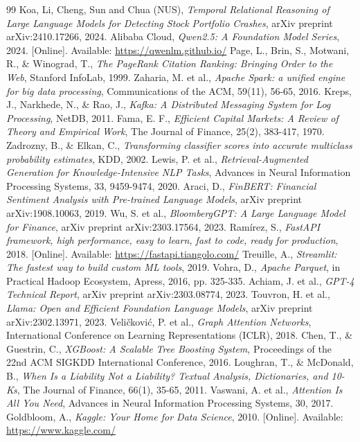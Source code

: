\documentclass[11pt, a4paper]{article}
\begin{document}
\newpage
\begin{thebibliography}{99}
Koa, Li, Cheng, Sun and Chua (NUS), \textit{Temporal Relational Reasoning of Large Language Models for Detecting Stock Portfolio Crashes}, arXiv preprint arXiv:2410.17266, 2024.
Alibaba Cloud, \textit{Qwen2.5: A Foundation Model Series}, 2024. [Online]. Available: \url{https://qwenlm.github.io/}
Page, L., Brin, S., Motwani, R., \& Winograd, T., \textit{The PageRank Citation Ranking: Bringing Order to the Web}, Stanford InfoLab, 1999.
Zaharia, M. et al., \textit{Apache Spark: a unified engine for big data processing}, Communications of the ACM, 59(11), 56-65, 2016.
Kreps, J., Narkhede, N., \& Rao, J., \textit{Kafka: A Distributed Messaging System for Log Processing}, NetDB, 2011.
Fama, E. F., \textit{Efficient Capital Markets: A Review of Theory and Empirical Work}, The Journal of Finance, 25(2), 383-417, 1970.
Zadrozny, B., \& Elkan, C., \textit{Transforming classifier scores into accurate multiclass probability estimates}, KDD, 2002.
Lewis, P. et al., \textit{Retrieval-Augmented Generation for Knowledge-Intensive NLP Tasks}, Advances in Neural Information Processing Systems, 33, 9459-9474, 2020.
Araci, D., \textit{FinBERT: Financial Sentiment Analysis with Pre-trained Language Models}, arXiv preprint arXiv:1908.10063, 2019.
Wu, S. et al., \textit{BloombergGPT: A Large Language Model for Finance}, arXiv preprint arXiv:2303.17564, 2023.
Ramírez, S., \textit{FastAPI framework, high performance, easy to learn, fast to code, ready for production}, 2018. [Online]. Available: \url{https://fastapi.tiangolo.com/}
Treuille, A., \textit{Streamlit: The fastest way to build custom ML tools}, 2019.
Vohra, D., \textit{Apache Parquet}, in Practical Hadoop Ecosystem, Apress, 2016, pp. 325-335.
Achiam, J. et al., \textit{GPT-4 Technical Report}, arXiv preprint arXiv:2303.08774, 2023.
Touvron, H. et al., \textit{Llama: Open and Efficient Foundation Language Models}, arXiv preprint arXiv:2302.13971, 2023.
Veličković, P. et al., \textit{Graph Attention Networks}, International Conference on Learning Representations (ICLR), 2018.
Chen, T., \& Guestrin, C., \textit{XGBoost: A Scalable Tree Boosting System}, Proceedings of the 22nd ACM SIGKDD International Conference, 2016.
Loughran, T., \& McDonald, B., \textit{When Is a Liability Not a Liability? Textual Analysis, Dictionaries, and 10-Ks}, The Journal of Finance, 66(1), 35-65, 2011.
Vaswani, A. et al., \textit{Attention Is All You Need}, Advances in Neural Information Processing Systems, 30, 2017.
Goldbloom, A., \textit{Kaggle: Your Home for Data Science}, 2010. [Online]. Available: \url{https://www.kaggle.com/}
\end{thebibliography}
\end{document}
